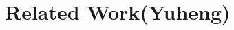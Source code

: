 \section{Related Work(Yuheng)}\label{sec:related_work}

\begin{comment}
Hierachically, the approaches to mitigate SEU consists of three categories.

1. Improve the device level robustness. (IBM silicon on chip paper.)

2. Improve the design level robustnss. (TMR papers, seustatics paper)

3. Improve the system level robusteness. 
First, hardening the latch circuit. 
 
(SEUhardenedByDesignLatchLevel paper)

Second, EADC code could be used to detect SEU. 

( SpaceCraftsThatUsesEADC(Hamming)paper.)

Hamming code could be used to mitigate SEU in both circuit level and in system level. Existing researches uses hamming code to harden the 8051 micro-controller's fault-tolerance against SEU.


(HammingEnhanced8051 paper)
(SEUmitigationUsingHammingCode) 

Hamming code has the deficiency when using in system level, that it must have fixed length data input to code into a code word. 

\end{comment}